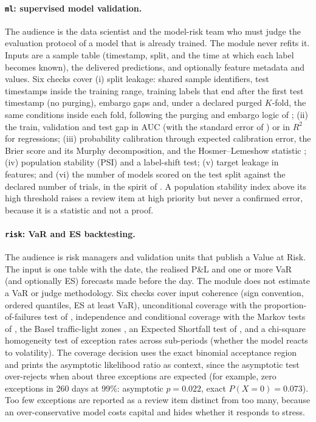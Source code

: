 \documentclass[11pt]{article}
\begin{document}
\paragraph{\texttt{ml}: supervised model validation.} The audience is the data scientist and the model-risk team who must judge the evaluation protocol of a model that is already trained. The module never refits it. Inputs are a sample table (timestamp, split, and the time at which each label becomes known), the delivered predictions, and optionally feature metadata and values. Six checks cover (i) split leakage: shared sample identifiers, test timestamps inside the training range, training labels that end after the first test timestamp (no purging), embargo gaps and, under a declared purged $K$-fold, the same conditions inside each fold, following the purging and embargo logic of \citet{LopezDePrado2018}; (ii) the train, validation and test gap in AUC (with the standard error of \citealt{HanleyMcNeil1982}) or in $R^2$ for regressions; (iii) probability calibration through expected calibration error, the Brier score and its Murphy decomposition, and the Hosmer--Lemeshow statistic \citep{HosmerLemeshow1980}; (iv) population stability (PSI) and a label-shift test; (v) target leakage in features; and (vi) the number of models scored on the test split against the declared number of trials, in the spirit of \citet{BaileyLopezDePrado2014}. A population stability index above its high threshold raises a review item at high priority but never a confirmed error, because it is a statistic and not a proof.

\paragraph{\texttt{risk}: VaR and ES backtesting.} The audience is risk managers and validation units that publish a Value at Risk. The input is one table with the date, the realised P\&L and one or more VaR (and optionally ES) forecasts made before the day. The module does not estimate a VaR or judge methodology. Six checks cover input coherence (sign convention, ordered quantiles, ES at least VaR), unconditional coverage with the proportion-of-failures test of \citet{Kupiec1995}, independence and conditional coverage with the Markov tests of \citet{Christoffersen1998}, the Basel traffic-light zones \citep{Basel1996}, an Expected Shortfall test of \citet{AcerbiSzekely2014}, and a chi-square homogeneity test of exception rates across sub-periods (whether the model reacts to volatility). The coverage decision uses the exact binomial acceptance region and prints the asymptotic likelihood ratio as context, since the asymptotic test over-rejects when about three exceptions are expected (for example, zero exceptions in 260 days at 99\%: asymptotic $p=0.022$, exact $P(X=0)=0.073$). Too few exceptions are reported as a review item distinct from too many, because an over-conservative model costs capital and hides whether it responds to stress.
\end{document}
